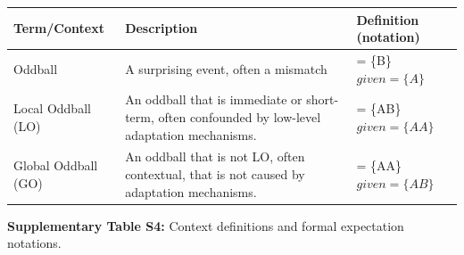 \documentclass[12pt]{article}
\begin{document}
\begin{longtable}[]{@{}lll@{}}
\toprule
\textbf{Term/Context} & \textbf{Description} & \textbf{Definition (notation)} \\
\midrule
\endhead
\bottomrule
\endlastfoot
Oddball & A surprising event, often a mismatch &  = \{B\}$ given  = \{A\}$ \\
Local Oddball (LO) & An oddball that is immediate or short-term, often confounded by low-level adaptation mechanisms. &  = \{AB\}$ given  = \{AA\}$ \\
Global Oddball (GO) & An oddball that is not LO, often contextual, that is not caused by adaptation mechanisms. &  = \{AA\}$ given  = \{AB\}$ \\
\end{longtable}

\textbf{Supplementary Table S4:} Context definitions and formal expectation notations.
\end{document}
